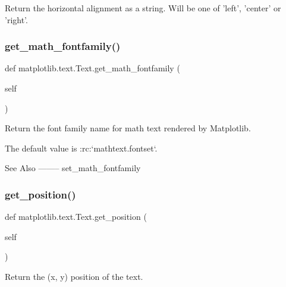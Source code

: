 \begin{DoxyVerb}Return the horizontal alignment as a string.  Will be one of
'left', 'center' or 'right'.
\end{DoxyVerb}
 \mbox{\label{classmatplotlib_1_1text_1_1Text_afa9b5e84ede3b846fd7ba7df77b4a477}} 
\subsubsection{\texorpdfstring{get\+\_\+math\+\_\+fontfamily()}{get\_math\_fontfamily()}}
{\footnotesize\ttfamily def matplotlib.\+text.\+Text.\+get\+\_\+math\+\_\+fontfamily (\begin{DoxyParamCaption}\item[{}]{self }\end{DoxyParamCaption})}

\begin{DoxyVerb}Return the font family name for math text rendered by Matplotlib.

The default value is :rc:`mathtext.fontset`.

See Also
--------
set_math_fontfamily
\end{DoxyVerb}
 \mbox{\label{classmatplotlib_1_1text_1_1Text_ae04a11859a96927d51c52c2955e13cc9}} 
\subsubsection{\texorpdfstring{get\+\_\+position()}{get\_position()}}
{\footnotesize\ttfamily def matplotlib.\+text.\+Text.\+get\+\_\+position (\begin{DoxyParamCaption}\item[{}]{self }\end{DoxyParamCaption})}

\begin{DoxyVerb}Return the (x, y) position of the text.\end{DoxyVerb}
 \mbox{\label{classmatplotlib_1_1text_1_1Text_ac64ce5be065cf2127913f4b04a04163a}} 
